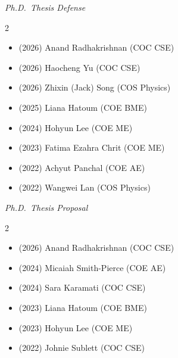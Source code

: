 \textit{Ph.D.\ Thesis Defense}
\vspace{-0.25cm}
\begin{multicols}{2}
\begin{itemize}
    \item (2026)  Anand Radhakrishnan (COC CSE)
    \item (2026)  Haocheng Yu (COC CSE)
    \item (2026)  Zhixin (Jack) Song (COS Physics)
    \item (2025)  Liana Hatoum (COE BME)
    \item (2024)  Hohyun Lee (COE ME)
    \item (2023)  Fatima Ezahra Chrit (COE ME)
    \item (2022)  Achyut Panchal (COE AE)
    \item (2022)  Wangwei Lan (COS Physics)
\end{itemize}
\end{multicols}

\textit{Ph.D.\ Thesis Proposal}
\vspace{-0.25cm}
\begin{multicols}{2}
\begin{itemize}
    \item (2026)  Anand Radhakrishnan (COC CSE)
    \item (2024)  Micaiah Smith-Pierce (COE AE)
    \item (2024)  Sara Karamati (COC CSE)
    \item (2023)  Liana Hatoum (COE BME)
    \item (2023)  Hohyun Lee (COE ME)
    \item (2022)  Johnie Sublett (COC CSE)
\end{itemize}
\end{multicols}

